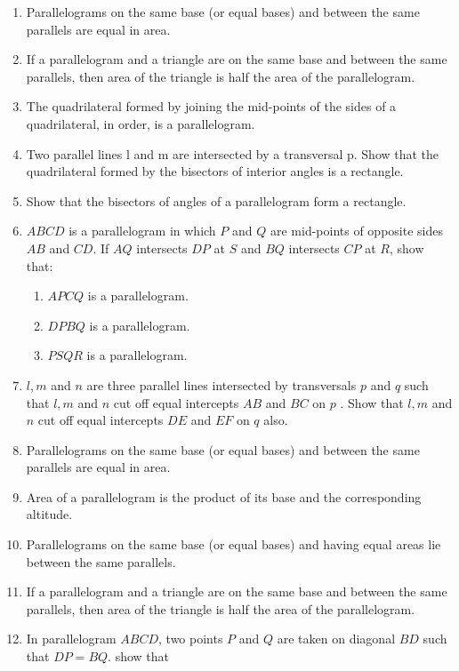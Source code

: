 \renewcommand{\theequation}{\theenumi}
\begin{enumerate}[label=\thesection.\arabic*.,ref=\thesection.\theenumi]
%
%
%
%
\item Parallelograms on the same base (or equal bases) and between the same parallels are equal in area.
\item If a parallelogram and a triangle are on the same base and between the same parallels, then area of the triangle is half the area of the parallelogram.
%
\item  The quadrilateral formed by joining the mid-points of the sides of a quadrilateral, in order, is a parallelogram.
%
%
\item Two parallel lines l and m are intersected by a transversal p. Show that the quadrilateral formed by the bisectors of interior angles is a rectangle.
%
\item Show that the bisectors of angles of a parallelogram form a rectangle.
%
%
\item $ABCD$ is a parallelogram in which $P$ and $Q$ are mid-points of opposite sides $AB$ and $CD$. If $AQ$ intersects $DP$ at $S$ and $BQ$ intersects $CP$ at $R$, show that: 
%
\begin{enumerate}
\item  $APCQ$ is a parallelogram. 
\item $DPBQ$ is a parallelogram. 
\item $PSQR$ is a parallelogram.
\end{enumerate}
%
\item $l, m$ and $n$ are three parallel lines intersected by transversals $p$ and $q$ such that $l, m$ and $n$ cut off equal intercepts $AB$ and $BC$ on $p$ . Show that $l, m$ and $n$ cut off equal intercepts $DE$ and $EF$ on $q$ also.
%
\item Parallelograms on the same base (or equal bases) and between the same parallels are equal in area.
\item Area of a parallelogram is the product of its base and the corresponding altitude. 
\item Parallelograms on the same base (or equal bases) and having equal areas lie between the same parallels.
\item If a parallelogram and a triangle are on the same base and between the same parallels, then area of the triangle is half the area of the parallelogram.
\item In parallelogram $ABCD$, two points $P$ and $Q$ are taken on diagonal $BD$ such that $DP = BQ$. show that \begin{enumerate}

\end{enumerate}
\end{enumerate}
